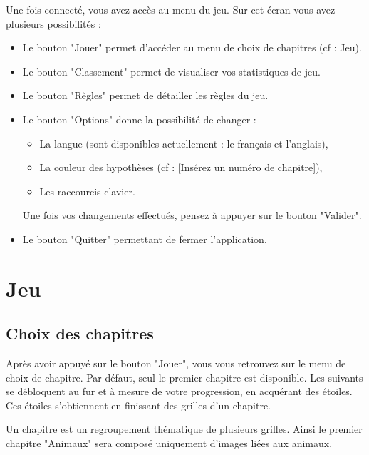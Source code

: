 \documentclass[a4paper, 12pt]{report}
\begin{document}
	    Une fois connecté, vous avez accès au menu du jeu. Sur cet écran vous avez plusieurs possibilités :
	    \begin{itemize}
            \item Le bouton "Jouer" permet d'accéder au menu de choix de chapitres (cf : Jeu).
            \item Le bouton "Classement" permet de visualiser vos statistiques de jeu.
            \item Le bouton "Règles" permet de détailler les règles du jeu.
            \item Le bouton "Options" donne la possibilité de changer :
            \begin{itemize}
                \item La langue (sont disponibles actuellement : le français et l'anglais),
                \item La couleur des hypothèses (cf : [Insérez un numéro de chapitre]),
                \item Les raccourcis clavier.
            \end{itemize}
            Une fois vos changements effectués, pensez à appuyer sur le bouton "Valider".
            \item Le bouton "Quitter" permettant de fermer l'application.
        \end{itemize}



	\section{Jeu}

        \subsection{Choix des chapitres}
        
            Après avoir appuyé sur le bouton "Jouer", vous vous retrouvez sur le menu de choix de chapitre.
            Par défaut, seul le premier chapitre est disponible. Les suivants se débloquent au fur et à mesure de votre progression, en acquérant des étoiles. 
            Ces étoiles s'obtiennent en finissant des grilles d'un chapitre.
            
            Un chapitre est un regroupement thématique de plusieurs grilles. Ainsi le premier chapitre "Animaux" sera composé uniquement d'images liées aux animaux. 
            
\end{document}
